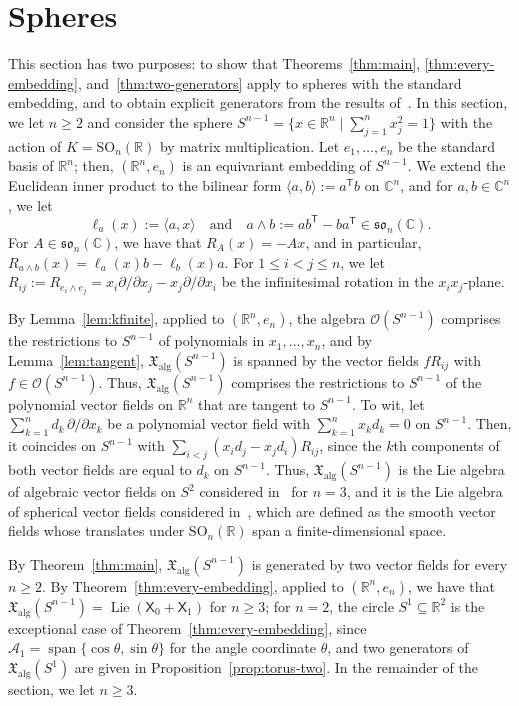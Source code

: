 \documentclass{article}
\newcommand{\R}{\mathbb{R}}
\newcommand{\C}{\mathbb{C}}
\newcommand{\xalg}{\mathfrak X_{\mathrm{alg}}}
\newcommand{\sX}{\mathsf{X}}
\newcommand{\Ocal}{\mathcal{O}}
\theoremstyle{definition}
\theoremstyle{plain}
\begin{document}
\section{Spheres}\label{sec:spheres}

This section has two purposes: to show that Theorems~\ref{thm:main}, \ref{thm:every-embedding}, and~\ref{thm:two-generators} apply to spheres with the standard embedding, and to obtain explicit generators from the results of~\cite{Luk77}. 
In this section, we let $n\geq2$ and consider the sphere $S^{n-1}=\{x\in\R^n\mid\sum_{j=1}^nx_j^2=1\}$ with the action of $K=\mathrm{SO}_n(\R)$ by matrix multiplication.
Let $e_1,\ldots,e_n$ be the standard basis of $\R^n$; then, $(\R^n,e_n)$ is an equivariant embedding of $S^{n-1}$.
We extend the Euclidean inner product to the bilinear form $\langle a,b\rangle:=a^{\mathsf T}b$ on $\C^n$, and for $a,b\in\C^n$, we let
$$
\ell_a(x):=\langle a,x\rangle \quad\mbox{and}\quad
a\wedge b:=ab^{\mathsf T}-ba^{\mathsf T}\in\mathfrak{so}_n(\C).
$$
For $A\in\mathfrak{so}_n(\C)$, we have that $R_A(x)=-Ax$, and in particular, $R_{a\wedge b}(x)=\ell_a(x)b-\ell_b(x)a$.
For $1\leq i<j\leq n$, we let $R_{ij}:=R_{e_i\wedge e_j}=x_i\partial/\partial x_j-x_j\partial/\partial x_i$ be the infinitesimal rotation in the $x_ix_j$-plane.


By Lemma~\ref{lem:kfinite}, applied to $(\R^n,e_n)$, the algebra $\Ocal(S^{n-1})$ comprises the restrictions to $S^{n-1}$ of polynomials in $x_1,\ldots,x_n$, and by Lemma~\ref{lem:tangent}, $\xalg(S^{n-1})$ is spanned by the vector fields $fR_{ij}$ with $f\in\Ocal(S^{n-1})$.
Thus, $\xalg(S^{n-1})$ comprises the restrictions to $S^{n-1}$ of the polynomial vector fields on $\R^n$ that are tangent to $S^{n-1}$.
To wit, let $\sum_{k=1}^nd_k\,\partial/\partial x_k$ be a polynomial vector field with $\sum_{k=1}^nx_kd_k=0$ on $S^{n-1}$. Then, it coincides on $S^{n-1}$ with $\sum_{i<j}(x_id_j-x_jd_i)R_{ij}$, since the $k$th components of both vector fields are equal to $d_k$ on $S^{n-1}$.
Thus, $\xalg(S^{n-1})$ is the Lie algebra of algebraic vector fields on $S^2$ considered in~\cite{CofDS2} for $n=3$,
and it is the Lie algebra of spherical vector fields considered in~\cite{Luk77}, which are defined as the smooth vector fields whose translates under $\mathrm{SO}_n(\R)$ span a finite-dimensional space.

By Theorem~\ref{thm:main}, $\xalg(S^{n-1})$ is generated by two vector fields for every $n\geq2$.
By Theorem~\ref{thm:every-embedding}, applied to $(\R^n,e_n)$, we have that $\xalg(S^{n-1})=\operatorname{Lie}(\sX_0+\sX_1)$ for $n\geq3$; for $n=2$, the circle $S^1\subseteq\R^2$ is the exceptional case of Theorem~\ref{thm:every-embedding}, since $\mathcal A_1=\operatorname{span}\{\cos\theta,\sin\theta\}$ for the angle coordinate $\theta$, and two generators of $\xalg(S^1)$ are given in Proposition~\ref{prop:torus-two}.
In the remainder of the section, we let $n\geq3$.
\end{document}
